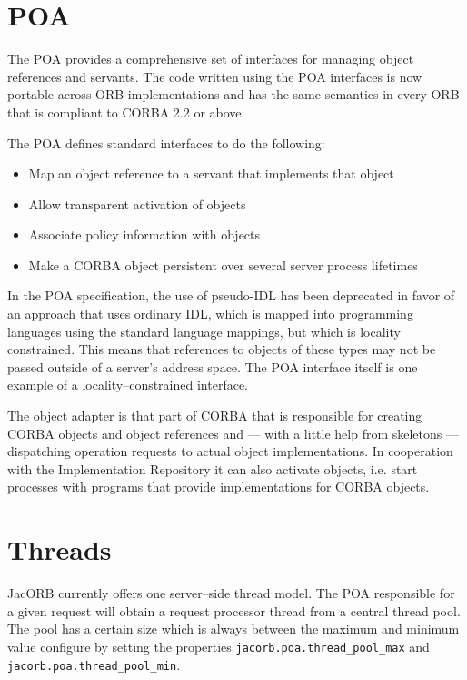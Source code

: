 \documentclass[12pt]{scrbook}
\begin{document}
\section{POA}

The POA provides a comprehensive set of interfaces for managing object
references and servants. The code  written using the POA interfaces is
now portable across ORB implementations  and has the same semantics in
every ORB that is compliant to CORBA 2.2 or above.

The POA defines standard interfaces to do the following:
\begin{itemize}
\item Map an object reference to a servant that implements that object
\item Allow transparent activation of objects
\item Associate policy information with objects
\item  Make a  CORBA  object persistent  over  several server  process
lifetimes
\end{itemize}

In the POA specification, the use of pseudo-IDL has been deprecated in
favor  of an approach  that uses  ordinary IDL,  which is  mapped into
programming languages using the  standard language mappings, but which
is  locality constrained.  This means  that references  to  objects of
these types may not be passed outside of a server's address space. The
POA  interface  itself  is  one  example of  a  locality--constrained
interface.  

The  object adapter  is that  part of  CORBA that  is  responsible for
creating CORBA  objects and  object references and  --- with  a little
help  from  skeletons ---  dispatching  operation  requests to  actual
object  implementations.   In  cooperation  with   the  Implementation
Repository  it can also  activate objects,  i.e. start  processes with
programs that provide implementations for CORBA objects.

\section{Threads}

JacORB  currently  offers  one   server--side  thread  model.  The  POA
responsible for a given request will obtain a request processor thread
from  a central  thread pool.  The pool  has a  certain size  which is
always between the maximum and  minimum value configure by setting the
properties     {\tt     jacorb.poa.thread\_pool\_max}     and     {\tt
jacorb.poa.thread\_pool\_min}.
\end{document}
